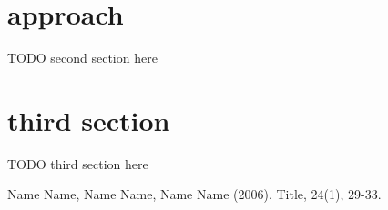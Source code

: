 \documentclass[journal]{IEEEtran}
\begin{document}



\section{approach}
TODO second section here

\section{third section}
TODO third section here

\begin{thebibliography}{1}

\bibitem{}
Name Name, Name Name, Name Name (2006). Title, 24(1), 29-33.

\end{thebibliography}
\end{document}
